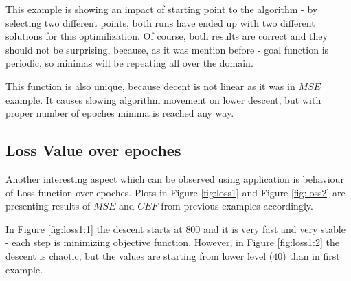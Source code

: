 \documentclass[11pt,a4paper]{IEEEtran}
\begin{document}
This example is showing an impact of starting point to the algorithm - by selecting two different points, both runs have ended up with two different solutions for this optimilization. Of course, both results are correct and they should not be surprising, because, as it was mention before - goal function is periodic, so minimas will be repeating all over the domain. 

This function is also unique, because decent is not linear as it was in $MSE$ example. It causes slowing algorithm movement on lower descent, but with proper number of epoches minima is reached any way.

\subsection{Loss Value over epoches}

Another interesting aspect which can be observed using application is behaviour of Loss function over epoches. Plots in Figure \ref{fig:loss1} and Figure \ref{fig:loss2} are presenting results of $MSE$ and $CEF$ from previous examples accordingly.

In Figure \ref{fig:loss1:1} the descent starts at $800$ and it is very fast and very stable - each step is minimizing objective function. However, in Figure \ref{fig:loss1:2} the descent is chaotic, but the values are starting from lower level ($40$) than in first example.
\end{document}
